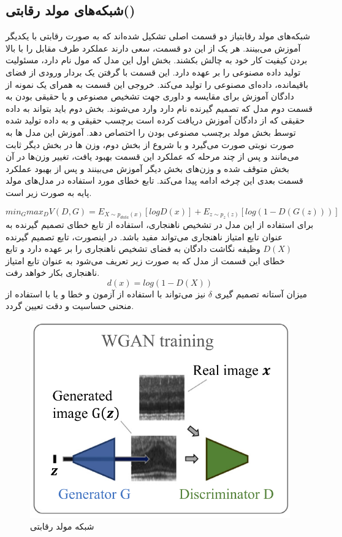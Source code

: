 \documentclass[12pt,a4paper]{report}
\theoremstyle{definition}
\theoremstyle{definition}
\begin{document}
\subsection{شبکه‌های مولد رقابتی()}
شبکه‌های مولد رقابتیاز دو قسمت اصلی تشکیل شده‌اند که به صورت رقابتی با یکدیگر آموزش می‌بینند. هر یک از این دو قسمت، سعی دارند عملکرد طرف مقابل را با بالا بردن کیفیت کار خود به چالش بکشند. بخش اول این مدل که مول نام دارد، مسئولیت تولید داده مصنوعی را بر عهده دارد. این قسمت با گرفتن یک بردار ورودی از فضای باقیمانده، داده‌ای مصنوعی را تولید می‌کند. خروجی این قسمت به همرای یک نمونه از دادگان آموزش برای مقایسه و داوری جهت تشخیص مصنوعی و یا حقیقی بودن به قسمت دوم مدل که تصمیم گیرنده نام دارد وارد می‌شوند. بخش دوم باید بتواند به داده حقیقی که از دادگان آموزش دریافت کرده است برچسب حقیقی و به داده تولید شده توسط بخش مولد برچسب مصنوعی بودن را اختصاص دهد. آموزش این مدل ها به صورت نوبتی صورت می‌گیرد و با شروع از بخش دوم، وزن ها در بخش دیگر ثابت می‌مانند و پس از چند مرحله که عملکرد این قسمت بهبود یافت، تغییر وزن‌ها در آن بخش متوقف شده و وزن‌های بخش دیگر آموزش می‌بینند و پس از بهبود عملکرد قسمت بعدی این چرخه ادامه پیدا می‌کند. تابع خطای مورد استفاده در مدل‌های مولد پایه به صورت زیر است.

\begin{equation}
	min_G max_D V(D, G) = E_{X \sim p_{data}(x)}[logD(x)] + E_{z \sim p_z(z)}[log(1-D(G(z)))]
\end{equation}
برای استفاده از این مدل در تشخیص ناهنجاری‌، استفاده از تابع خطای تصمیم گیرنده به عنوان تابع امتیاز ناهنجاری می‌تواند مفید باشد. در اینصورت، تابع تصمیم گیرنده $D(X)$ وظیفه نگاشت دادگان به فضای تشخیص ناهنجاری را بر عهده دارد و تابع خطای این قسمت از مدل که به صورت زیر تعریف می‌شود به عنوان تابع امتیاز ناهنجاری بکار خواهد رفت.
\begin{equation}
d(x) = log(1- D(X))
\end{equation}
 میزان آستانه تصمیم گیری $\delta$ نیز می‌تواند با استفاده از آزمون و خطا و یا با استفاده از منحنی حساسیت و دقت تعیین گردد.\\


\begin{figure}[!h]
	\begin{center}
		\includegraphics[width=0.7\linewidth]{./images/figures/gan.png}
	\end{center}
	\caption{شبکه مولد رقابتی}
	\label{fig:vae}
	\centering
\end{figure}
\end{document}
